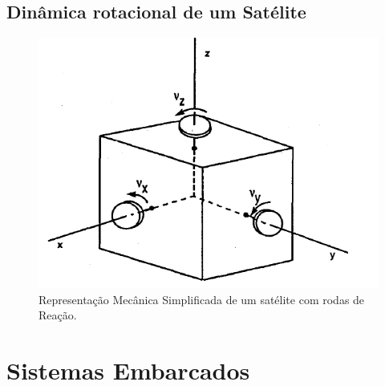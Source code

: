 \subsection{Dinâmica rotacional de um Satélite}

\begin{figure}[htb]
  \caption{Representação Mecânica Simplificada de um satélite com rodas de Reação.}
  \begin{center}
      \includegraphics[scale=0.75]{img/satellite_controlhand_p1306}
  \end{center}
  \label{fig:satellite_controlhand_p1306}
\end{figure}

\section{Sistemas Embarcados}

